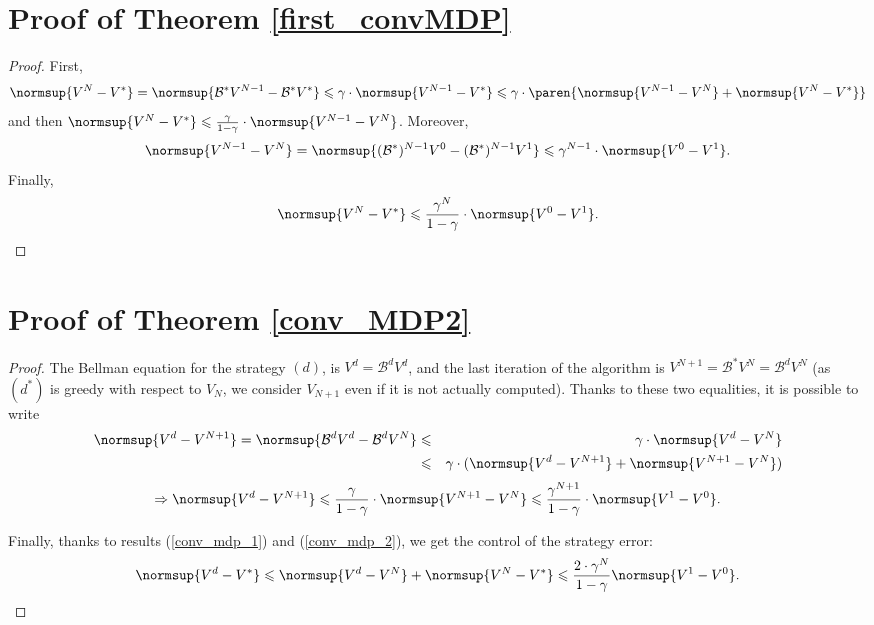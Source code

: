 \section{Proof of Theorem \ref{first_convMDP}}
\begin{proof}
First,
\[ \normsup{V^N -V^*} = \normsup{ \mathcal{B}^* V^{N-1} - \mathcal{B}^* V^*} \leqslant \gamma \cdot \normsup{ V^{N-1} - V^* } \leqslant \gamma \cdot \paren{ \normsup{V^{N-1} - V^N} + \normsup{V^N - V^*} } \] 
and then $\normsup{V^N -V^*} \leqslant \frac{\gamma}{1-\gamma} \cdot \normsup{ V^{N-1} - V^{N} }$.
Moreover, 
\[ \normsup{ V^{N-1} - V^{N} } = \normsup{ (\mathcal{B}^*)^{N-1} V^{0} - (\mathcal{B}^*)^{N-1} V^{1} } \leqslant \gamma^{N-1} \cdot \normsup{ V^{0} - V^{1} }.\]
Finally,
\begin{equation*} 
\normsup{V^N -V^*} \leqslant \frac{\gamma^N}{1-\gamma} \cdot \normsup{ V^{0} - V^{1} }. 
\end{equation*}
\end{proof}








\section{Proof of Theorem \ref{conv_MDP2}}
\begin{proof}
The Bellman equation for the strategy $(d)$,
is $V^d = \mathcal{B}^d V^d$, 
and the last iteration of the algorithm is 
$V^{N+1} = \mathcal{B}^* V^{N} = \mathcal{B}^d V^{N}$ 
(as $(d^*)$ is greedy with respect to $V_N$,
we consider $V_{N+1}$ even if it is not actually computed). 
Thanks to these two equalities,
it is possible to write
\begin{eqnarray}
\nonumber \normsup{V^d - V^{N+1}} = \normsup{\mathcal{B}^d V^d - \mathcal{B}^d V^{N}} & \leqslant & \gamma \cdot \normsup{V^d - V^{N}} \\
\nonumber & \leqslant & \gamma \cdot (\normsup{V^d - V^{N+1}} + \normsup{V^{N+1} - V^{N}}) 
\end{eqnarray}
\begin{equation}
\Rightarrow  \normsup{V^d - V^{N+1}} \leqslant \frac{\gamma}{1 - \gamma} \cdot \normsup{V^{N+1} -V^{N}} \leqslant \frac{\gamma^{N+1}}{1 - \gamma} \cdot \normsup{V^1 -V^{0}}.
\label{conv_mdp_2} 
\end{equation}

Finally, thanks to results (\ref{conv_mdp_1}) and (\ref{conv_mdp_2}), 
we get the control of the strategy error:
\[ \normsup{ V^d - V^* } \leqslant \normsup{ V^d - V^N } + \normsup{ V^N - V^* } \leqslant \frac{2 \cdot \gamma^N}{1-\gamma} \normsup{ V^1 - V^0 }. \]
\end{proof}










